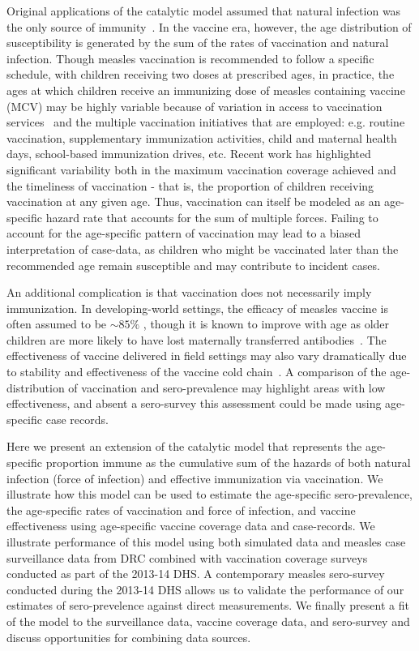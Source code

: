 \documentclass[nofootinbib,aps,pre,twocolumn,superscriptaddress,showkeys,showpacs]{revtex4-1}
\begin{document}
Original applications of the catalytic model assumed that natural infection was the only source of immunity~\cite{griffiths_catalytic_1974}.  
In the vaccine era, however, the age distribution of susceptibility is generated by the sum of the rates of vaccination and natural infection. 
Though measles vaccination is recommended to follow a specific schedule, with children receiving two doses at prescribed ages, in practice, the ages at which children receive an immunizing dose of measles containing vaccine (MCV) may be highly variable because of variation in access to vaccination services~\cite{METCALF2017S14,TRENTINI20171089,Winter2018Sero} and the multiple vaccination initiatives that are employed: e.g. routine vaccination, supplementary immunization activities, child and maternal health days, school-based immunization drives, etc.
Recent work has highlighted significant variability both in the maximum vaccination coverage achieved and the timeliness of vaccination - that is, the proportion of children receiving vaccination at any given age. Thus, vaccination can itself be modeled as an age-specific hazard rate that accounts for the sum of multiple forces.
Failing to account for the age-specific pattern of vaccination may lead to a biased interpretation of case-data, as children who might be vaccinated later than the recommended age remain susceptible and may contribute to incident cases. 

An additional complication is that vaccination does not necessarily imply immunization.  
In developing-world settings, the efficacy of measles vaccine is often assumed to be $\sim 85 \%$ , though it is known to improve with age as older children are more likely to have lost maternally transferred antibodies~\cite{Uzicanin2011}. The effectiveness of vaccine delivered in field settings may also vary dramatically due to stability and effectiveness of the vaccine cold chain~\cite{Doshi2017}.  
A comparison of the age-distribution of vaccination and sero-prevalence may highlight areas with low effectiveness, and absent a sero-survey this assessment could be made using age-specific case records.

Here we present an extension of the catalytic model that represents the age-specific proportion immune as the cumulative sum of the hazards of both natural infection (force of infection) and effective immunization via vaccination.
We illustrate how this model can be used to estimate the age-specific sero-prevalence,  the age-specific rates of vaccination and force of infection, and vaccine effectiveness using age-specific vaccine coverage data and case-records. 
We illustrate performance of this model using both simulated data and measles case surveillance data from DRC combined with vaccination coverage surveys conducted as part of the 2013-14 DHS.  
A contemporary measles sero-survey conducted during the 2013-14 DHS allows us to validate the performance of our estimates of sero-prevelence against direct measurements. 
We finally present a fit of the model to the surveillance data, vaccine coverage data, and sero-survey and discuss opportunities for combining data sources.
\end{document}
